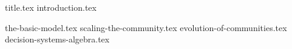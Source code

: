 \documentclass[runningheads]{llncs}
\begin{document}
{title.tex}
{introduction.tex}


{the-basic-model.tex}
{scaling-the-community.tex}
{evolution-of-communities.tex}
{decision-systems-algebra.tex}
\end{document}
